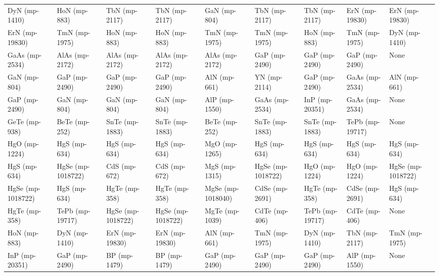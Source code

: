 \begin{longtable}{lllllllll}
    DyN (mp-1410) &      HoN (mp-883) &       TbN (mp-2117) &     TbN (mp-2117) &        GaN (mp-804) &     TbN (mp-2117) &     TbN (mp-2117) &    ErN (mp-19830) &    ErN (mp-19830) \\
   ErN (mp-19830) &     TmN (mp-1975) &        HoN (mp-883) &      HoN (mp-883) &       TmN (mp-1975) &     TmN (mp-1975) &      HoN (mp-883) &     TmN (mp-1975) &     DyN (mp-1410) \\
   GaAs (mp-2534) &    AlAs (mp-2172) &      AlAs (mp-2172) &    AlAs (mp-2172) &      AlAs (mp-2172) &     GaP (mp-2490) &     GaP (mp-2490) &     GaP (mp-2490) &              None \\
     GaN (mp-804) &     GaP (mp-2490) &       GaP (mp-2490) &     GaP (mp-2490) &        AlN (mp-661) &      YN (mp-2114) &     GaP (mp-2490) &    GaAs (mp-2534) &      AlN (mp-661) \\
    GaP (mp-2490) &      GaN (mp-804) &        GaN (mp-804) &      GaN (mp-804) &       AlP (mp-1550) &    GaAs (mp-2534) &    InP (mp-20351) &    GaAs (mp-2534) &              None \\
    GeTe (mp-938) &     BeTe (mp-252) &      SnTe (mp-1883) &    SnTe (mp-1883) &       BeTe (mp-252) &    SnTe (mp-1883) &    SnTe (mp-1883) &   TePb (mp-19717) &              None \\
    HgO (mp-1224) &      HgS (mp-634) &        HgS (mp-634) &      HgS (mp-634) &       MgO (mp-1265) &      HgS (mp-634) &      HgS (mp-634) &      HgS (mp-634) &      HgS (mp-634) \\
     HgS (mp-634) & HgSe (mp-1018722) &        CdS (mp-672) &      CdS (mp-672) &       MgS (mp-1315) & HgSe (mp-1018722) &     HgO (mp-1224) &     HgO (mp-1224) & HgSe (mp-1018722) \\
HgSe (mp-1018722) &      HgS (mp-634) &       HgTe (mp-358) &     HgTe (mp-358) &   MgSe (mp-1018040) &    CdSe (mp-2691) &     HgTe (mp-358) &    CdSe (mp-2691) &      HgS (mp-634) \\
    HgTe (mp-358) &   TePb (mp-19717) &   HgSe (mp-1018722) & HgSe (mp-1018722) &      MgTe (mp-1039) &     CdTe (mp-406) &   TePb (mp-19717) &     CdTe (mp-406) &              None \\
     HoN (mp-883) &     DyN (mp-1410) &      ErN (mp-19830) &    ErN (mp-19830) &        AlN (mp-661) &     TmN (mp-1975) &     DyN (mp-1410) &     TbN (mp-2117) &     TmN (mp-1975) \\
   InP (mp-20351) &     GaP (mp-2490) &        BP (mp-1479) &      BP (mp-1479) &       GaP (mp-2490) &     GaP (mp-2490) &     GaP (mp-2490) &     AlP (mp-1550) &              None \\

\end{longtable}
